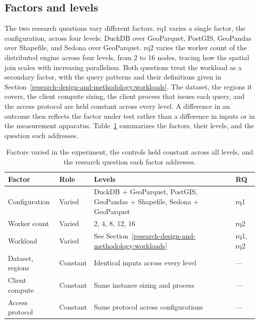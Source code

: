 \subsection{Factors and levels}
\label{research-design-and-methodology:overview-and-experimental-design:factors-and-levels}
The two research questions vary different factors. \acrshort{rq}1 varies a single factor, the configuration, across four levels: DuckDB over GeoParquet, PostGIS, GeoPandas over Shapefile, and Sedona over GeoParquet. \acrshort{rq}2 varies the worker count of the distributed engine across four levels, from \num{2} to \num{16} nodes, tracing how the spatial join scales with increasing parallelism. Both questions treat the workload as a secondary factor, with the query patterns and their definitions given in Section~\ref{research-design-and-methodology:workloads}. The dataset, the regions it covers, the client compute sizing, the client process that issues each query, and the access protocol are held constant across every level. A difference in an outcome then reflects the factor under test rather than a difference in inputs or in the measurement apparatus. Table~\ref{tab:methodology:factors} summarizes the factors, their levels, and the question each addresses.

\begin{table}[H]
    \centering
    \begin{tabular}{@{}l l p{6.5cm} l@{}}
        \toprule
        \textbf{Factor} & \textbf{Role} & \textbf{Levels} & \textbf{RQ} \\
        \midrule
        Configuration & Varied      & DuckDB + GeoParquet, PostGIS, GeoPandas + Shapefile, Sedona + GeoParquet & \acrshort{rq}1 \\
        Worker count  & Varied      & \num{2}, \num{4}, \num{8}, \num{12}, \num{16} & \acrshort{rq}2 \\
        Workload      & Varied      & See Section~\ref{research-design-and-methodology:workloads} & \acrshort{rq}1, \acrshort{rq}2 \\
        \midrule
        Dataset, regions & Constant & Identical inputs across every level & --- \\
        Client compute   & Constant & Same instance sizing and process & --- \\
        Access protocol  & Constant & Same protocol across configurations & --- \\
        \bottomrule
    \end{tabular}
    \caption[Experimental factors and controls]{Factors varied in the experiment, the controls held constant across all levels, and the research question each factor addresses.}
    \label{tab:methodology:factors}
\end{table}

